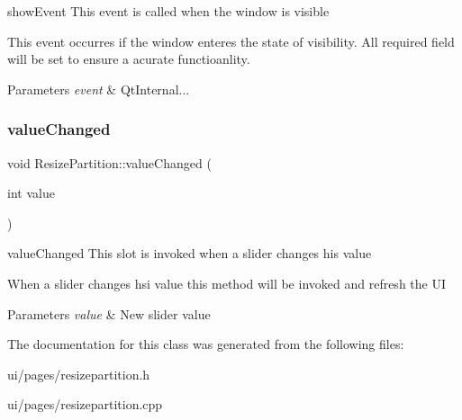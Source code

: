 show\+Event This event is called when the window is visible 

This event occurres if the window enteres the state of visibility. All required field will be set to ensure a acurate functioanlity. 
\begin{DoxyParams}{Parameters}
{\em event} & Qt\+Internal... \\
\hline
\end{DoxyParams}
\mbox{\label{classui_1_1window_1_1_resize_partition_a6cdad6be2f435ad46bcf0b537b062a40}} 
\subsubsection{\texorpdfstring{value\+Changed}{valueChanged}}
{\footnotesize\ttfamily void Resize\+Partition\+::value\+Changed (\begin{DoxyParamCaption}\item[{int}]{value }\end{DoxyParamCaption})\hspace{0.3cm}{\ttfamily [slot]}}



value\+Changed This slot is invoked when a slider changes his value 

When a slider changes hsi value this method will be invoked and refresh the UI 
\begin{DoxyParams}{Parameters}
{\em value} & New slider value \\
\hline
\end{DoxyParams}


The documentation for this class was generated from the following files\+:\begin{DoxyCompactItemize}
\item 
ui/pages/resizepartition.\+h\item 
ui/pages/resizepartition.\+cpp\end{DoxyCompactItemize}
